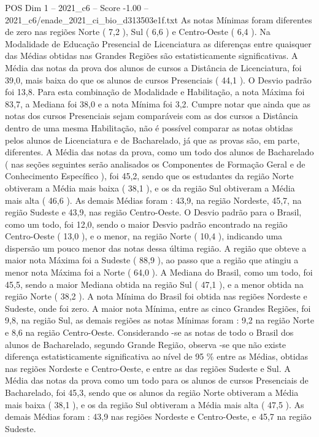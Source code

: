 \begin{textsample}{POS Dim 1 – 2021\_c6 – Score -1.00 – 2021\_c6/enade\_2021\_ci\_bio\_d313503e1f.txt}
As notas Mínimas foram diferentes de zero nas regiões Norte ( 7,2 ), Sul ( 6,6 ) e Centro-Oeste ( 6,4 ).
Na Modalidade de Educação Presencial de Licenciatura as diferenças entre quaisquer das Médias obtidas nas Grandes Regiões são estatisticamente significativas.
A Média das notas da prova dos alunos de cursos a Distância de Licenciatura, foi 39,0, mais baixa do que os alunos de cursos Presenciais ( 44,1 ).
O Desvio padrão foi 13,8.
Para esta combinação de Modalidade e Habilitação, a nota Máxima foi 83,7, a Mediana foi 38,0 e a nota Mínima foi 3,2.
Cumpre notar que ainda que as notas dos cursos Presenciais sejam comparáveis com as dos cursos a Distância dentro de uma mesma Habilitação, não é possível comparar as notas obtidas pelos alunos de Licenciatura e de Bacharelado, já que as provas são, em parte, diferentes.
A Média das notas da prova, como um todo dos alunos de Bacharelado ( nas seções seguintes serão analisados os Componentes de Formação Geral e de Conhecimento Específico ), foi 45,2, sendo que os estudantes da região Norte obtiveram a Média mais baixa ( 38,1 ), e os da região Sul obtiveram a Média mais alta ( 46,6 ).
As demais Médias foram : 43,9, na região Nordeste, 45,7, na região Sudeste e 43,9, nas região Centro-Oeste.
O Desvio padrão para o Brasil, como um todo, foi 12,0, sendo o maior Desvio padrão encontrado na região Centro-Oeste ( 13,0 ), e o menor, na região Norte ( 10,4 ), indicando uma dispersão um pouco menor das notas dessa última região.
A região que obteve a maior nota Máxima foi a Sudeste ( 88,9 ), ao passo que a região que atingiu a menor nota Máxima foi a Norte ( 64,0 ).
A Mediana do Brasil, como um todo, foi 45,5, sendo a maior Mediana obtida na região Sul ( 47,1 ), e a menor obtida na região Norte ( 38,2 ).
A nota Mínima do Brasil foi obtida nas regiões Nordeste e Sudeste, onde foi zero.
A maior nota Mínima, entre as cinco Grandes Regiões, foi 9,8, na região Sul, as demais regiões as notas Mínimas foram : 9,2 na região Norte e 8,6 na região Centro-Oeste.
Considerando -se as notas de todo o Brasil dos alunos de Bacharelado, segundo Grande Região, observa -se que não existe diferença estatisticamente significativa ao nível de 95 \% entre as Médias, obtidas nas regiões Nordeste e Centro-Oeste, e entre as das regiões Sudeste e Sul.
A Média das notas da prova como um todo para os alunos de cursos Presenciais de Bacharelado, foi 45,3, sendo que os alunos da região Norte obtiveram a Média mais baixa ( 38,1 ), e os da região Sul obtiveram a Média mais alta ( 47,5 ).
As demais Médias foram : 43,9 nas regiões Nordeste e Centro-Oeste, e 45,7 na região Sudeste.

\end{textsample}
